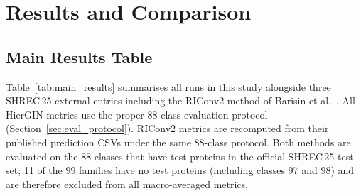 \section{Results and Comparison}
\label{sec:results}

\subsection{Main Results Table}

Table~\ref{tab:main_results} summarises all runs in this study alongside
three SHREC\,25 external entries including the RIConv2 method of Barisin
et al.~\cite{riconv2}.
All HierGIN metrics use the proper 88-class evaluation protocol
(Section~\ref{sec:eval_protocol}).
RIConv2 metrics are recomputed from their published prediction CSVs under
the same 88-class protocol.
Both methods are evaluated on the 88 classes that have test proteins in the
official SHREC\,25 test set; 11 of the 99 families have no test proteins
(including classes 97 and 98) and are therefore excluded from all
macro-averaged metrics.

